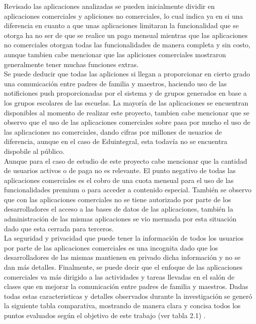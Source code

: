     Revisado las aplicaciones analizadas se pueden inicialmente dividir en aplicaciones comerciales y apliciones no comerciales, lo cual indica ya en si una diferencia en cuanto a que unas aplicaciones limitaran la funcionalidad que se otorga ha no ser de que se realice un pago mensual mientras que las aplicaciones no comerciales otorgan todas las funcionalidades de manera completa y sin costo, aunque tambien cabe mencionar que las apliciones comerciales mostraron generalmente tener muchas funciones extras. \\ Se puede deducir que todas las apliciones si llegan a proporcionar en cierto grado una comunicación entre padres de familia y maestros, haciendo uso de las notificiones push proporcionadas por el sistema y de grupos generados en base a los grupos escolares de las escuelas. La mayoría de las aplicaciones se encuentran disponibles al momento de realizar este proyecto, tambien cabe mencionar que se observo que el uso de las aplicaciones comerciales sobre pasa por mucho el uso de las aplicaciones no comerciales, dando cifras por millones de usuarios de diferencia, aunque en el caso de Eduintegral, esta todavía no se encuentra dispobile al público. \\ Aunque para el caso de estudio de este proyecto cabe mencionar que la cantidad de usuarios activos o de paga no es relevante. El punto negativo de todas las aplicaciones comerciales es el cobro de una cuota mensual para el uso de las funcionalidades premium o para acceder a contenido especial. También se observo que con las aplicaciones comerciales no se tiene autorizado por parte de los desarrolladores el acceso a las bases de datos de las aplicaciones, también la administración de las mismas aplicaciones se vio mermada por esta situación dado que esta cerrada para terceros. \\ La seguridad y privacidad que puede tener la información de todos los usuarios por parte de las aplicaciones comerciales es una incognita dado que los desarrolladores de las mismas mantienen en privado dicha información y no se dan más detalles.
    Finalmente, se puede decir que el enfoque de las aplicaciones comerciales va más dirigido a las actividades y tareas llevadas en el salón de clases que en mejorar la comunicación entre padres de familia y maestros. Dadas todas estas caracteristicas y detalles observados durante la investigación se generó la siguiente tabla comparativa, mostrando de manera clara y concisa todos los puntos evaluados según el objetivo de este trabajo (ver tabla 2.1) \cite{eduintegral}.
        
